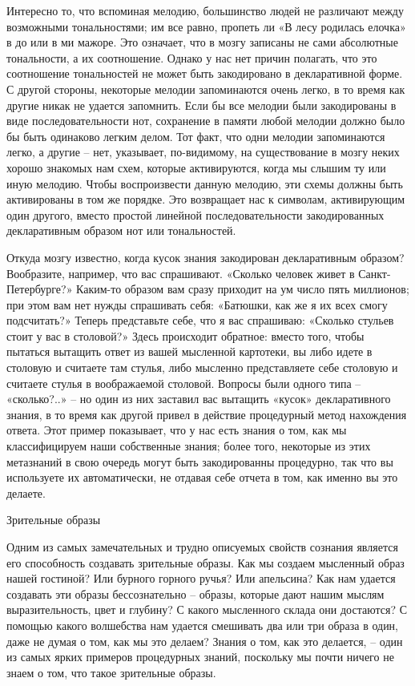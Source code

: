 \documentclass[../main.tex]{subfiles}
\begin{document}
Интересно то, что вспоминая мелодию, большинство людей не различают между возможными тональностями; им все равно, пропеть ли «В лесу родилась елочка» в до или в ми мажоре. Это означает, что в мозгу записаны не сами абсолютные тональности, а их соотношение. Однако у нас нет причин полагать, что это соотношение тональностей не может быть закодировано в декларативной форме. С другой стороны, некоторые мелодии запоминаются очень легко, в то время как другие никак не удается запомнить. Если бы все мелодии были закодированы в виде последовательности нот, сохранение в памяти любой мелодии должно было бы быть одинаково легким делом. Тот факт, что одни мелодии запоминаются легко, а другие \--- нет, указывает, по-видимому, на существование в мозгу неких хорошо знакомых нам схем, которые активируются, когда мы слышим ту или иную мелодию. Чтобы воспроизвести данную мелодию, эти схемы должны быть активированы в том же порядке. Это возвращает нас к символам, активирующим один другого, вместо простой линейной последовательности закодированных декларативным образом нот или тональностей.

Откуда мозгу известно, когда кусок знания закодирован декларативным образом? Вообразите, например, что вас спрашивают. «Сколько человек живет в Санкт-Петербурге?» Каким-то образом вам сразу приходит на ум число пять миллионов; при этом вам нет нужды спрашивать себя: «Батюшки, как же я их всех смогу подсчитать?» Теперь представьте себе, что я вас спрашиваю: «Сколько стульев стоит у вас в столовой?» Здесь происходит обратное: вместо того, чтобы пытаться вытащить ответ из вашей мысленной картотеки, вы либо идете в столовую и считаете там стулья, либо мысленно представляете себе столовую и считаете стулья в воображаемой столовой. Вопросы были одного типа \--- «сколько?..» \--- но один из них заставил вас вытащить «кусок» декларативного знания, в то время как другой привел в действие процедурный метод нахождения ответа. Этот пример показывает, что у нас есть знания о том, как мы классифицируем наши собственные знания; более того, некоторые из этих метазнаний в свою очередь могут быть закодированны процедурно, так что вы используете их автоматически, не отдавая себе отчета в том, как именно вы это делаете.

Зрительные образы

Одним из самых замечательных и трудно описуемых свойств сознания является его способность создавать зрительные образы. Как мы создаем мысленный образ нашей гостиной? Или бурного горного ручья? Или апельсина? Как нам удается создавать эти образы бессознательно \--- образы, которые дают нашим мыслям выразительность, цвет и глубину? С какого мысленного склада они достаются? С помощью какого волшебства нам удается смешивать два или три образа в один, даже не думая о том, как мы это делаем? Знания о том, как это делается, \--- один из самых ярких примеров процедурных знаний, поскольку мы почти ничего не знаем о том, что такое зрительные образы.
\end{document}

